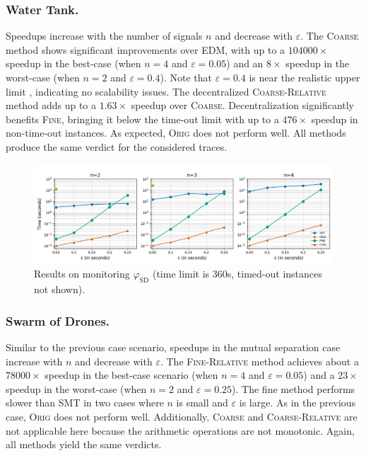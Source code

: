 \vspace{-0.5em}
\subsubsection{Water Tank.}
Speedups increase with the number of signals \(n\) and decrease with \(\varepsilon\).
The \textsc{Coarse} method shows significant improvements over EDM, with up to a $104000\times$ speedup in the best-case (when \(n=4\) and \(\varepsilon=0.05\)) and an $8\times$ speedup in the worst-case (when \(n=2\) and \(\varepsilon=0.4\)).
Note that \(\varepsilon=0.4\) is near the realistic upper limit \cite{MomtazAB23}, indicating no scalability issues.
The decentralized \textsc{Coarse-Relative} method adds up to a $1.63\times$ speedup over \textsc{Coarse}.
Decentralization significantly benefits \textsc{Fine}, bringing it below the time-out limit with up to a $476\times$ speedup in non-time-out instances.
As expected, \textsc{Orig} does not perform well.
All methods produce the same verdict for the considered traces.

\begin{figure}[t]
	\begin{center}
		\includegraphics[width=\linewidth]{ms.png}
		\caption{Results on monitoring $\varphi_{\text{SD}}$ (time limit is 360s, timed-out instances not shown).}
	\end{center}
\end{figure}

\vspace{-0.5em}
\subsubsection{Swarm of Drones.}
Similar to the previous case scenario, speedups in the mutual separation case increase with \(n\) and decrease with \(\varepsilon\).
The \textsc{Fine-Relative} method achieves about a $78000\times$ speedup in the best-case scenario (when \(n=4\) and \(\varepsilon=0.05\)) and a $23\times$ speedup in the worst-case (when \(n=2\) and \(\varepsilon=0.25\)).
The fine method performs slower than SMT in two cases where \(n\) is small and \(\varepsilon\) is large.
%
As in the previous case, \textsc{Orig} does not perform well.
Additionally, \textsc{Coarse} and \textsc{Coarse-Relative} are not applicable here because the arithmetic operations are not monotonic.
Again, all methods yield the same verdicts.

